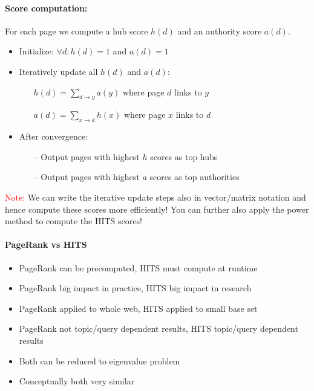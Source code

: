 \documentclass[a4paper,11pt]{article}
\begin{document}
\begin{multicols}{2}
\paragraph{Score computation:}
For each page we compute a hub score $h(d)$ and an authority score $a(d)$.
\begin{itemize}
  \item Initialize: $\forall d: h(d) = 1$ and $a(d) = 1$
  \item Iteratively update all $h(d)$ and $a(d)$:\\
  \begin{itemize}
    \item[] $h(d) = \sum\limits_{d \rightarrow y} a(y)$ \hspace{0.7cm}where page $d$ links to $y$
    \item[] $a(d) = \sum\limits_{x \rightarrow d} h(x)$ \hspace{0.7cm}where page $x$ links to $d$
  \end{itemize}
  \item After convergence:\\
  \begin{itemize}
    \item[--] Output pages with highest $h$ scores as top hubs
    \item[--] Output pages with highest $a$ scores as top authorities
  \end{itemize}
\end{itemize}
\textcolor{red}{Note:} We can write the iterative update steps also in vector/matrix notation and hence compute these scores more efficiently! You can further also apply the power method to compute the HITS scores!
\paragraph{PageRank vs HITS}
\begin{itemize}
  \item PageRank can be precomputed, HITS must compute at runtime
  \item PageRank big impact in practice, HITS big impact in research
  \item PageRank applied to whole web, HITS applied to small base set
  \item PageRank not topic/query dependent results, HITS topic/query dependent results
  \item Both can be reduced to eigenvalue problem
  \item Conceptually both very similar
\end{itemize}


\end{multicols}
\end{document}
